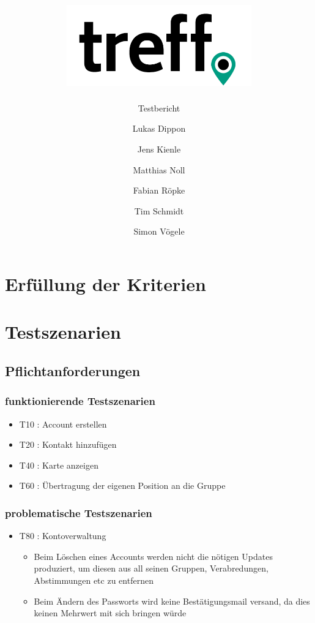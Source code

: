 \documentclass[parskip=full,11pt]{scrartcl}
\title{\includegraphics[width = 80mm]{images/logo_crop.png}}
\subtitle{\huge Testbericht}
\author{Lukas Dippon
        \and Jens Kienle
        \and Matthias Noll
        \and Fabian Röpke
        \and Tim Schmidt
        \and Simon Vögele}
\begin{document}
\maketitle
\thispagestyle{empty} %

\pagebreak
\tableofcontents

\pagebreak
\section{Erfüllung der Kriterien}

\section{Testszenarien}

\subsection{Pflichtanforderungen}
	\subsubsection{funktionierende Testszenarien}
	\begin{itemize}
		\item T10 : Account erstellen
		\item T20 : Kontakt hinzufügen
		\item T40 : Karte anzeigen
		\item T60 : Übertragung der eigenen Position an die Gruppe
	\end{itemize}

	\subsubsection{problematische Testszenarien}
	\begin{itemize}
		\item T80 : Kontoverwaltung
			\begin{itemize}
			\item Beim Löschen eines Accounts werden nicht die nötigen Updates
			produziert, um diesen aus all seinen Gruppen, Verabredungen, Abstimmungen
			etc zu entfernen
			\item Beim Ändern des Passworts wird keine Bestätigungsmail versand, da
			dies keinen Mehrwert mit sich bringen würde
			\end{itemize}
	\end{itemize}
\end{document}

